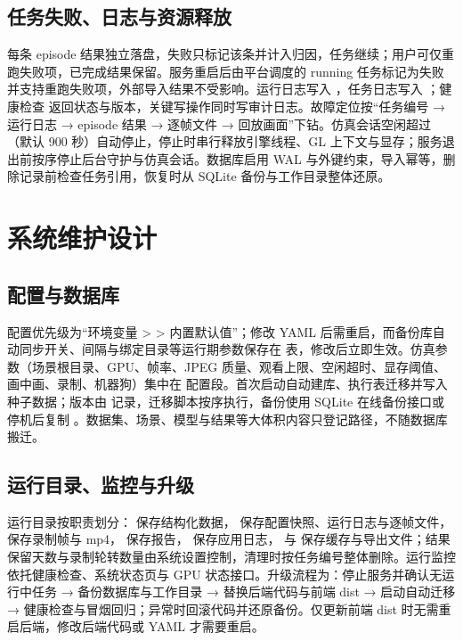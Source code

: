 \section{任务失败、日志与资源释放}

每条 episode 结果独立落盘，失败只标记该条并计入归因，任务继续；用户可仅重跑失败项，已完成结果保留。服务重启后由平台调度的 running 任务标记为失败并支持重跑失败项，外部导入结果不受影响。运行日志写入 ，任务日志写入 ；健康检查  返回状态与版本，关键写操作同时写审计日志。故障定位按“任务编号 → 运行日志 → episode 结果 → 逐帧文件 → 回放画面”下钻。仿真会话空闲超过 （默认 900 秒）自动停止，停止时串行释放引擎线程、GL 上下文与显存；服务退出前按序停止后台守护与仿真会话。数据库启用 WAL 与外键约束，导入幂等，删除记录前检查任务引用，恢复时从 SQLite 备份与工作目录整体还原。

\chapter{系统维护设计}

\section{配置与数据库}

配置优先级为“环境变量 \textgreater{}  \textgreater{} 内置默认值”；修改 YAML 后需重启，而备份库自动同步开关、间隔与绑定目录等运行期参数保存在  表，修改后立即生效。仿真参数（场景根目录、GPU、帧率、JPEG 质量、观看上限、空闲超时、显存阈值、画中画、录制、机器狗）集中在  配置段。首次启动自动建库、执行表迁移并写入种子数据；版本由  记录，迁移脚本按序执行，备份使用 SQLite 在线备份接口或停机后复制 。数据集、场景、模型与结果等大体积内容只登记路径，不随数据库搬迁。

\section{运行目录、监控与升级}

运行目录按职责划分： 保存结构化数据， 保存配置快照、运行日志与逐帧文件， 保存录制帧与 mp4， 保存报告， 保存应用日志， 与  保存缓存与导出文件；结果保留天数与录制轮转数量由系统设置控制，清理时按任务编号整体删除。运行监控依托健康检查、系统状态页与 GPU 状态接口。升级流程为：停止服务并确认无运行中任务 → 备份数据库与工作目录 → 替换后端代码与前端 dist → 启动自动迁移 → 健康检查与冒烟回归；异常时回滚代码并还原备份。仅更新前端 dist 时无需重启后端，修改后端代码或 YAML 才需要重启。

